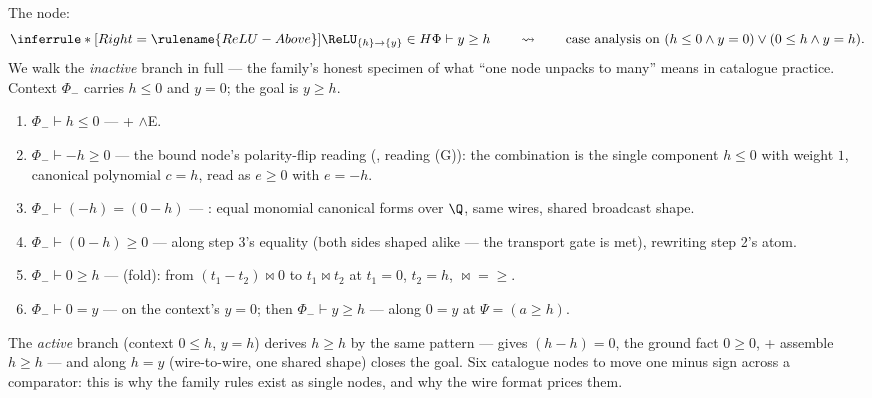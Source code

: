 

\begin{brecipe}
\label{rec:reluabove-instance}
The node:
\[
\inferrule*[Right=\rulename{ReLU-Above}]{
  \ReLU_{\{h\}\to\{y\}} \in H
}{
  \Phi \vdash y \geq h
}
\qquad\rightsquigarrow\qquad
\text{case analysis on }
(h \leq 0 \wedge y = 0) \vee (0 \leq h \wedge y = h).
\]
We walk the \emph{inactive} branch in full --- the family's honest
specimen of what ``one node unpacks to many'' means in catalogue
practice. Context $\Phi_{-}$ carries $h \leq 0$ and $y = 0$; the goal
is $y \geq h$.
\begin{enumerate}
\item $\Phi_{-} \vdash h \leq 0$ ---  + $\wedge$E.
\item $\Phi_{-} \vdash -h \geq 0$ --- the bound node's polarity-flip
  reading (, reading (G)): the combination is the
  single component $h \leq 0$ with weight $1$, canonical polynomial
  $c = h$, read as $e \geq 0$ with $e = -h$.
\item $\Phi_{-} \vdash (-h) = (0 - h)$ --- : equal
  monomial canonical forms over $\Q$, same wires, shared broadcast
  shape.
\item $\Phi_{-} \vdash (0 - h) \geq 0$ ---  along
  step 3's equality (both sides shaped alike --- the transport gate is
  met), rewriting step 2's atom.
\item $\Phi_{-} \vdash 0 \geq h$ ---  (fold): from
  $(t_1 - t_2) \bowtie 0$ to $t_1 \bowtie t_2$ at $t_1 = 0$, $t_2 =
  h$, $\bowtie = {\geq}$.
\item $\Phi_{-} \vdash 0 = y$ ---  on the context's
  $y = 0$; then $\Phi_{-} \vdash y \geq h$ ---  along
  $0 = y$ at $\Psi = (a \geq h)$.
\end{enumerate}
The \emph{active} branch (context $0 \leq h$, $y = h$) derives $h \geq
h$ by the same pattern ---  gives $(h - h) = 0$,
 the ground fact $0 \geq 0$,  +
 assemble $h \geq h$ --- and 
along $h = y$ (wire-to-wire, one shared shape) closes the goal. Six
catalogue nodes to move one minus sign across a comparator: this is
why the family rules exist as single nodes, and why the wire format
prices them.
\end{brecipe}

